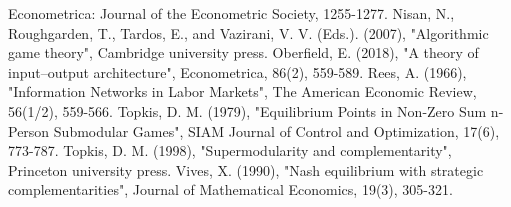 \documentclass[12pt]{article}
\theoremstyle{definition}
\begin{document}
\begin{thebibliography}{99}
	Econometrica: Journal of the Econometric Society, 1255-1277.
	Nisan, N., Roughgarden, T., Tardos, E., and Vazirani, V. V. (Eds.). (2007),
	"Algorithmic game theory",
	Cambridge university press.
	Oberfield, E. (2018),
	"A theory of input–output architecture",
	Econometrica, 86(2), 559-589.
\bibitem{}
	Rees, A. (1966),
	"Information Networks in Labor Markets",
	The American Economic Review, 56(1/2), 559-566.
	Topkis, D. M. (1979),
	"Equilibrium Points in Non-Zero Sum n-Person Submodular Games",
	SIAM Journal of Control and Optimization, 17(6), 773-787.
	Topkis, D. M. (1998),
	"Supermodularity and complementarity",
	Princeton university press.
\bibitem{}
	Vives, X. (1990),
	"Nash equilibrium with strategic complementarities",
	Journal of Mathematical Economics, 19(3), 305-321.
\end{thebibliography}
\end{document}
